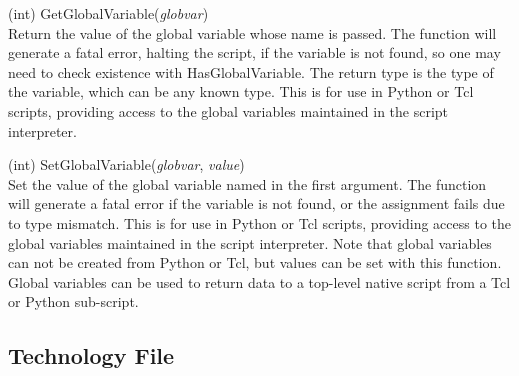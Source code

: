 \begin{description}
\item{(int) \vt GetGlobalVariable({\it globvar\/})}\\
Return the value of the global variable whose name is passed.  The
function will generate a fatal error, halting the script, if the
variable is not found, so one may need to check existence with {\vt
HasGlobalVariable}.  The return type is the type of the variable,
which can be any known type.  This is for use in Python or Tcl
scripts, providing access to the global variables maintained in the
{\Xic} script interpreter.

\item{(int) \vt SetGlobalVariable({\it globvar\/}, {\it value\/})}\\
Set the value of the global variable named in the first argument.  The
function will generate a fatal error if the variable is not found, or
the assignment fails due to type mismatch.  This is for use in Python
or Tcl scripts, providing access to the global variables maintained in
the {\Xic} script interpreter.  Note that global variables can not be
created from Python or Tcl, but values can be set with this function. 
Global variables can be used to return data to a top-level native
script from a Tcl or Python sub-script.
\end{description}


\subsection{Technology File}

